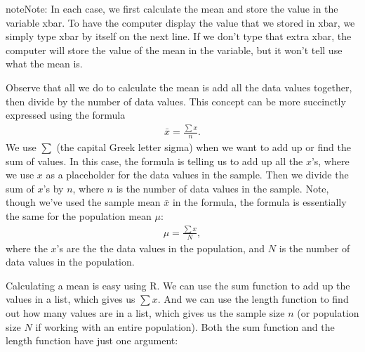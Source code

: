 \documentclass[letterpaper,10pt,english]{jupyterBook}
\begin{document}
\begin{sphinxadmonition}{note}{Note:}
\sphinxAtStartPar
In each case, we first calculate the mean and store the value in the variable xbar. To have the computer display the value that we stored in xbar, we simply type xbar by itself on the next line. If we don’t type that extra xbar, the computer will store the value of the mean in the variable, but it won’t tell use what the mean is.
\end{sphinxadmonition}

\sphinxAtStartPar
Observe that all we do to calculate the mean is add all the data values together, then divide by the number of data values. This concept can be more succinctly expressed using the formula
\begin{equation*}
\begin{split} \bar{x} = \frac{\sum x}{n}. \end{split}
\end{equation*}
\sphinxAtStartPar
We use \(\sum\) (the capital Greek letter sigma) when we want to add up or find the sum of values. In this case, the formula is telling us to add up all the \(x\)’s, where we use \(x\) as a placeholder for the data values in the sample. Then we divide the sum of \(x\)’s by \(n\), where \(n\) is the number of data values in the sample. Note, though we’ve used the sample mean \(\bar{x}\) in the formula, the formula is essentially the same for the population mean \(\mu\):
\begin{equation*}
\begin{split} \mu = \frac{\sum x}{N}, \end{split}
\end{equation*}
\sphinxAtStartPar
where the \(x\)’s are the the data values in the population, and \(N\) is the number of data values in the population.

\sphinxAtStartPar
Calculating a mean is easy using R. We can use the sum function to add up the values in a list, which gives us \(\sum x\). And we can use the length function to find out how many values are in a list, which gives us the sample size \(n\) (or population size \(N\) if working with an entire population). Both the sum function and the length function have just one argument:

\begin{sphinxVerbatim}[commandchars=\\\{\}]
\end{sphinxVerbatim}
\end{document}
